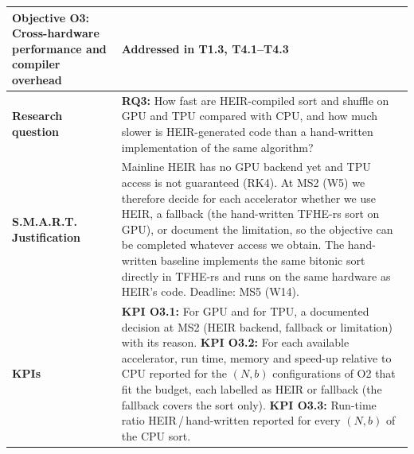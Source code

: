 \begin{table}[htbp]
\centering
\renewcommand{\arraystretch}{1.3}
\begin{tabularx}{\textwidth}{|p{}|L|}
\hline
\textbf{Objective O3: Cross-hardware performance and compiler overhead} & \textbf{Addressed in T1.3, T4.1--T4.3} \\ \hline
\textbf{Research question} & \textbf{RQ3:} How fast are HEIR-compiled sort and shuffle on GPU and TPU compared with CPU, and how much slower is HEIR-generated code than a hand-written implementation of the same algorithm? \\ \hline
\textbf{S.M.A.R.T. Justification} & Mainline HEIR has no GPU backend yet and TPU access is not guaranteed (RK4). At MS2 (W5) we therefore decide for each accelerator whether we use HEIR, a fallback (the hand-written TFHE-rs sort on GPU), or document the limitation, so the objective can be completed whatever access we obtain. The hand-written baseline implements the same bitonic sort directly in TFHE-rs and runs on the same hardware as HEIR's code. Deadline: MS5 (W14). \\ \hline
\textbf{KPIs} & \textbf{KPI O3.1:} For GPU and for TPU, a documented decision at MS2 (HEIR backend, fallback or limitation) with its reason. \newline \textbf{KPI O3.2:} For each available accelerator, run time, memory and speed-up relative to CPU reported for the $(N, b)$ configurations of O2 that fit the budget, each labelled as HEIR or fallback (the fallback covers the sort only). \newline \textbf{KPI O3.3:} Run-time ratio HEIR\,/\,hand-written reported for every $(N, b)$ of the CPU sort. \\ \hline
\end{tabularx}
\end{table}

